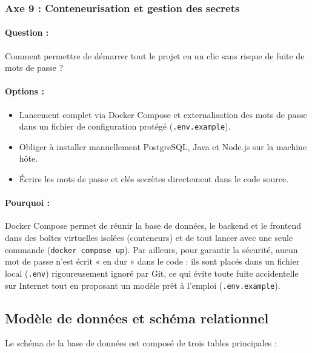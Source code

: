 \documentclass[11pt,a4paper]{article}
\begin{document}
\subsubsection{Axe 9 : Conteneurisation et gestion des secrets}
\paragraph{Question :} Comment permettre de démarrer tout le projet en un clic sans risque de fuite de mots de passe ?
\paragraph{Options :}
\begin{itemize}
    \item[$\boxtimes$] Lancement complet via Docker Compose et externalisation des mots de passe dans un fichier de configuration protégé (\texttt{.env.example}).
    \item[$\square$] Obliger à installer manuellement PostgreSQL, Java et Node.js sur la machine hôte.
    \item[$\square$] Écrire les mots de passe et clés secrètes directement dans le code source.
\end{itemize}
\paragraph{Pourquoi :} Docker Compose permet de réunir la base de données, le backend et le frontend dans des boîtes virtuelles isolées (conteneurs) et de tout lancer avec une seule commande (\texttt{docker compose up}). Par ailleurs, pour garantir la sécurité, aucun mot de passe n'est écrit « en dur » dans le code : ils sont placés dans un fichier local (\texttt{.env}) rigoureusement ignoré par Git, ce qui évite toute fuite accidentelle sur Internet tout en proposant un modèle prêt à l'emploi (\texttt{.env.example}).

\newpage

\subsection{Modèle de données et schéma relationnel}

Le schéma de la base de données est composé de trois tables principales :
\end{document}
